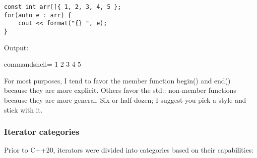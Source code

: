 \begin{lstlisting}[style=styleCXX]
const int arr[]{ 1, 2, 3, 4, 5 };
for(auto e : arr) {
	cout << format("{} ", e);
}
\end{lstlisting}

Output:

\begin{tcblisting}{commandshell={}}
1 2 3 4 5
\end{tcblisting}

For most purposes, I tend to favor the member function begin() and end() because they are more explicit. Others favor the std:: non-member functions because they are more general. Six or half-dozen; I suggest you pick a style and stick with it.

\subsubsection{Iterator categories}

Prior to C++20, iterators were divided into categories based on their capabilities:

